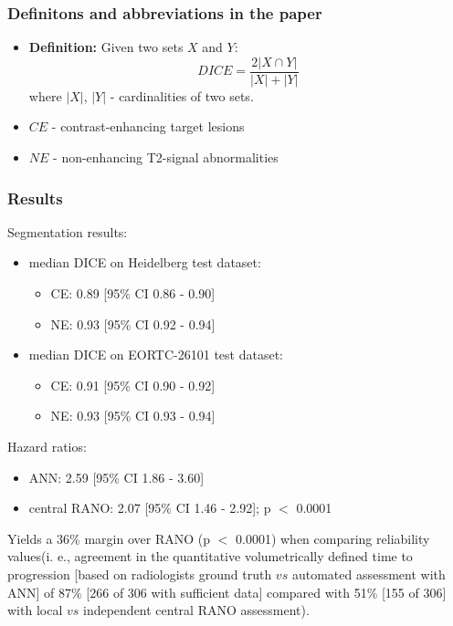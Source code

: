 \documentclass{beamer}
\begin{document}
\begin{frame}
\frametitle{Definitons and abbreviations in the paper}
\begin{itemize}
	\item \textbf{Definition: }Given two sets $X$ and $Y$:
	$$DICE = \frac{2|X \cap Y|}{|X| + |Y|}$$
	where $|X|$, $|Y|$ - cardinalities of two sets.
	\item $CE$ - contrast-enhancing target lesions
	\item $NE$ - non-enhancing T2-signal abnormalities
\end{itemize}
\end{frame}




\begin{frame}
\frametitle{Results}
Segmentation results:
\begin{itemize}
	\item median DICE on Heidelberg test dataset:
	\begin{itemize}
		\item CE: 0.89 [95\% CI 0.86 - 0.90]
		\item NE: 0.93 [95\% CI 0.92 - 0.94]
	\end{itemize}
	\item median DICE on EORTC-26101 test dataset:
	\begin{itemize}
		\item CE: 0.91 [95\% CI 0.90 - 0.92]
		\item NE: 0.93 [95\% CI 0.93 - 0.94]
	\end{itemize}
\end{itemize}
Hazard ratios:
\begin{itemize}
	\item          ANN: 2.59 [95\% CI 1.86 - 3.60]
	\item central RANO: 2.07 [95\% CI 1.46 - 2.92]; p $<$ 0.0001
\end{itemize}
Yields a 36\% margin over RANO (p $<$ 0.0001) when comparing reliability values(i. e., agreement in the quantitative volumetrically defined time to progression [based on radiologists ground truth $vs$ automated assessment with ANN] of 87\% [266 of 306 with sufficient data] compared with 51\% [155 of 306] with local $vs$ independent central RANO assessment).
\end{frame}
\end{document}
